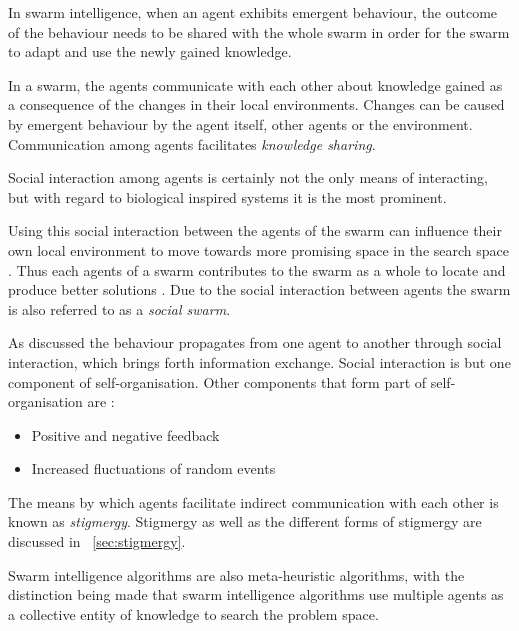 In swarm intelligence, when an agent exhibits emergent behaviour, the outcome of the behaviour needs to be shared with the whole swarm in order for the swarm to adapt and use the newly gained knowledge\cite{CompuIntelligenceIntro,FundamentalSwarm}.

In a swarm, the agents communicate with each other about knowledge gained as a consequence of the changes in their local environments\cite{SwarmArt,ChaoticSwarmIntel}. Changes can be caused by emergent behaviour by the agent itself, other agents or the environment\cite{CompuIntelligenceIntro,FundamentalSwarm}. Communication among agents facilitates \emph{knowledge sharing}\cite{SwarmArt,FundamentalSwarm}. 

Social interaction among agents is certainly not the only means of interacting, but with regard to biological inspired systems it is the most prominent\cite{CompuIntelligenceIntro}.

Using this social interaction between the agents of the swarm can influence their own local environment to move towards more promising space in the search space \cite{ChaoticSwarmIntel,CompuIntelligenceIntro}. Thus each agents of a swarm contributes to the swarm as a whole to locate and produce better solutions \cite{BeeJobShop}. Due to the social interaction between agents the swarm is also referred to as a \emph{social swarm}\cite{ChaoticSwarmIntel,FundamentalSwarm}.

As discussed the behaviour propagates from one agent to another through social interaction, which brings forth information exchange\cite{SwarmArt}. Social interaction is but one component of self-organisation. Other components that form part of self-organisation are \cite{SIPowerInNums}:
\begin{itemize}
\item Positive and negative feedback\cite{SIPowerInNums}
\item Increased fluctuations of random events\cite{SIPowerInNums}
\end{itemize}

The means by which agents facilitate indirect communication with each other is known as \emph{stigmergy}. Stigmergy as well as the different forms of stigmergy are discussed in ~\ref{sec:stigmergy}.

Swarm intelligence algorithms are also meta-heuristic algorithms, with the distinction being made that swarm intelligence algorithms use multiple agents as a collective entity of knowledge to search the problem space\cite{SwarmArt,ChaoticSwarmIntel,BeeJobShop,CompuIntelligenceIntro,FundamentalSwarm}.

